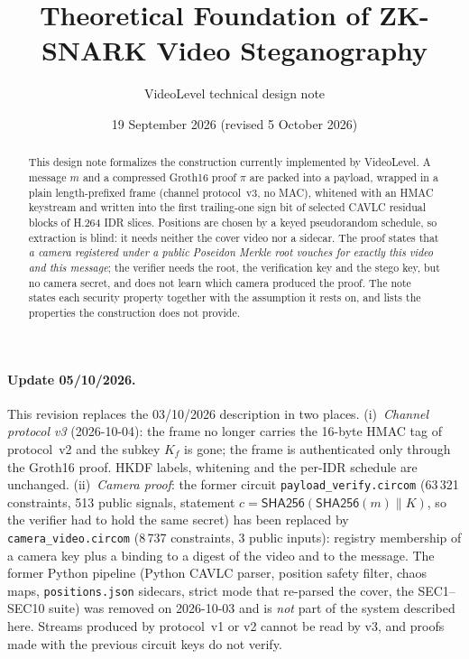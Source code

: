 \documentclass[11pt,a4paper]{article}
\title{Theoretical Foundation of ZK-SNARK Video Steganography}
\author{VideoLevel technical design note}
\date{19 September 2026 (revised 5 October 2026)}
\theoremstyle{definition}
\theoremstyle{remark}
\newcommand{\SHA}{\mathsf{SHA256}}
\newcommand{\cat}{\parallel}
\begin{document}
\maketitle
\begin{abstract}
This design note formalizes the construction currently implemented by
VideoLevel. A message $m$ and a compressed Groth16 proof $\pi$ are packed into a
payload, wrapped in a plain length-prefixed frame (channel protocol~v3, no MAC),
whitened with an HMAC keystream and written into the first trailing-one sign bit
of selected CAVLC residual blocks of H.264 IDR slices. Positions are chosen by a
keyed pseudorandom schedule, so extraction is blind: it needs neither the cover
video nor a sidecar. The proof states that \emph{a camera registered under a
public Poseidon Merkle root vouches for exactly this video and this message}; the
verifier needs the root, the verification key and the stego key, but no camera
secret, and does not learn which camera produced the proof. The note states each
security property together with the assumption it rests on, and lists the
properties the construction does not provide.
\end{abstract}

\paragraph{Update 05/10/2026.}
This revision replaces the 03/10/2026 description in two places.
(i)~\emph{Channel protocol v3} (2026-10-04): the frame no longer carries the
16-byte HMAC tag of protocol~v2 and the subkey $K_f$ is gone; the frame is
authenticated only through the Groth16 proof. HKDF labels, whitening and the
per-IDR schedule are unchanged. (ii)~\emph{Camera proof}: the former circuit
\texttt{payload\_verify.circom} (63\,321 constraints, 513 public signals,
statement $c=\SHA(\SHA(m)\cat K)$, so the verifier had to hold the same secret)
has been replaced by \texttt{camera\_video.circom} (8\,737 constraints, 3 public
inputs): registry membership of a camera key plus a binding to a digest of the
video and to the message. The former Python pipeline (Python CAVLC parser,
position safety filter, chaos maps, \texttt{positions.json} sidecars, strict
mode that re-parsed the cover, the SEC1--SEC10 suite) was removed on
2026-10-03 and is \emph{not} part of the system described here. Streams
produced by protocol~v1 or v2 cannot be read by v3, and proofs made with the
previous circuit keys do not verify.
\end{document}
